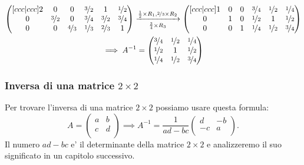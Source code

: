 \begin{solution}
\begin{gather*}
\begin{pmatrix}[ccc|ccc]
            2 & 0       & 0         & \nicefrac32  & 1       & \nicefrac12\\
            0 & \nicefrac32 & 0         & \nicefrac34  & \nicefrac32 & \nicefrac34\\
            0 & 0       & \nicefrac43   & \nicefrac13  & \nicefrac23 & 1\\
        \end{pmatrix} \xrightarrow[\frac34 \times R_3]{\frac12 \times R_1, \nicefrac23 \times R_2}
        \begin{pmatrix}[ccc|ccc]
            1 & 0 & 0 & \nicefrac34 & \nicefrac12 & \nicefrac14\\
            0 & 1 & 0 & \nicefrac12 & 1       & \nicefrac12\\
            0 & 0 & 1 & \nicefrac14 & \nicefrac12 & \nicefrac34 \\
        \end{pmatrix} \\
        \implies A^{-1} = \begin{pmatrix}
            \nicefrac34 & \nicefrac12 & \nicefrac14\\
            \nicefrac12 & 1       & \nicefrac12\\
            \nicefrac14 & \nicefrac12 & \nicefrac34 \\
        \end{pmatrix}
    \end{gather*}
\end{solution}

\subsubsection{Inversa di una matrice $2 \times 2$}

Per trovare l'inversa di una matrice $2 \times 2$ possiamo usare questa formula:
\[
    A = \begin{pmatrix}
        a & b \\
        c & d \\
    \end{pmatrix} \implies 
    A^{-1} = \frac{1}{ad-bc}\begin{pmatrix}
        d  & -b \\
        -c & a \\
    \end{pmatrix}.
\] Il numero $ad - bc$ e' il determinante della matrice $2 \times 2$ e analizzeremo il suo significato in un capitolo successivo.

